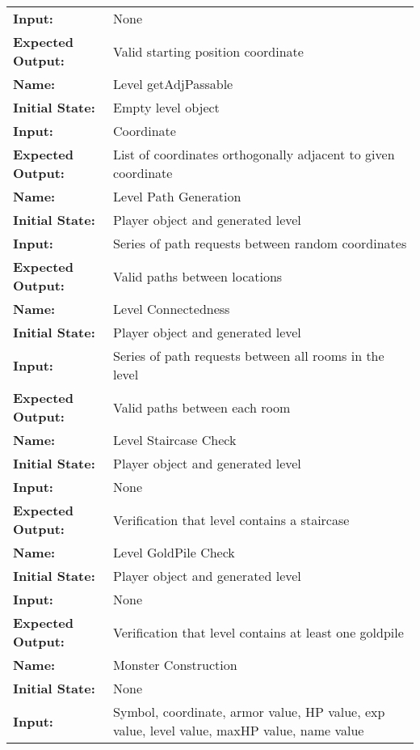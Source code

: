 \documentclass[12pt, titlepage]{article}
\begin{document}
\begin{center}
\begin{longtable}{ l | p{10cm} }
				\textbf{Input:} & None\\
				\textbf{Expected Output:} & Valid starting position coordinate\\[0.6em]
				\hline
				\rule{0pt}{1.5em}\textbf{Name:} & Level getAdjPassable\\
				\textbf{Initial State:} & Empty level object\\
				\textbf{Input:} & Coordinate\\
				\textbf{Expected Output:} & List of coordinates orthogonally adjacent to given coordinate\\[0.6em]
				\hline
				\rule{0pt}{1.5em}\textbf{Name:} & Level Path Generation\\
				\textbf{Initial State:} & Player object and generated level\\
				\textbf{Input:} & Series of path requests between random coordinates\\
				\textbf{Expected Output:} & Valid paths between locations\\[0.6em]
				\hline
				\rule{0pt}{1.5em}\textbf{Name:} & Level Connectedness\\
				\textbf{Initial State:} & Player object and generated level\\
				\textbf{Input:} & Series of path requests between all rooms in the level\\
				\textbf{Expected Output:} & Valid paths between each room\\[0.6em]
				\hline
				\rule{0pt}{1.5em}\textbf{Name:} & Level Staircase Check\\
				\textbf{Initial State:} & Player object and generated level\\
				\textbf{Input:} & None\\
				\textbf{Expected Output:} & Verification that level contains a staircase\\[0.6em]
				\hline
				\rule{0pt}{1.5em}\textbf{Name:} & Level GoldPile Check\\
				\textbf{Initial State:} & Player object and generated level\\
				\textbf{Input:} & None\\
				\textbf{Expected Output:} & Verification that level contains at least one goldpile\\[0.6em]
				\hline
				\rule{0pt}{1.5em}\textbf{Name:} & Monster Construction\\
				\textbf{Initial State:} & None\\
				\textbf{Input:} & Symbol, coordinate, armor value, HP value, exp value, level value, maxHP value, name value\\

\end{longtable}
\end{center}
\end{document}
